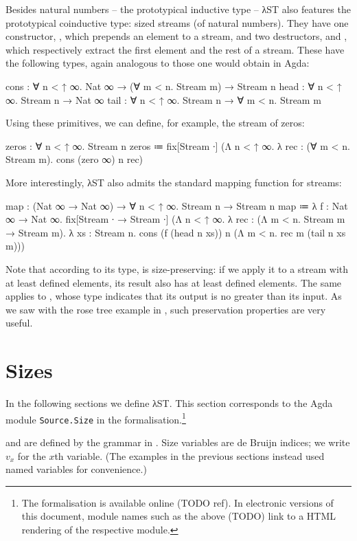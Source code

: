Besides natural numbers -- the prototypical inductive type -- λST also features
the prototypical coinductive type: sized streams (of natural numbers). They have
one constructor, , which prepends an element to a stream, and two
destructors,  and , which respectively extract the first
element and the rest of a stream. These have the following types, again
analogous to those one would obtain in Agda:
\begin{code}
  cons : ∀ n < ↑ ∞. Nat ∞ → (∀ m < n. Stream m) → Stream n
  head : ∀ n < ↑ ∞. Stream n → Nat ∞
  tail : ∀ n < ↑ ∞. Stream n → ∀ m < n. Stream m
\end{code}
Using these primitives, we can define, for example, the stream of zeros:
\begin{code}
  zeros : ∀ n < ↑ ∞. Stream n
  zeros ≔ fix[Stream ∙]
            (Λ n < ↑ ∞. λ rec : (∀ m < n. Stream m).
              cons (zero ∞) n rec)
\end{code}
More interestingly, λST also admits the standard mapping function for streams:
\begin{code}
  map : (Nat ∞ → Nat ∞) → ∀ n < ↑ ∞. Stream n → Stream n
  map ≔ λ f : Nat ∞ → Nat ∞. fix[Stream ∙ → Stream ∙]
          (Λ n < ↑ ∞. λ rec : (Λ m < n. Stream m → Stream m). λ xs : Stream n.
            cons (f (head n xs)) n (Λ m < n. rec m (tail n xs m)))
\end{code}
Note that according to its type,  is size-preserving: if we apply it
to a stream with at least  defined elements, its result also has at
least  defined elements. The same applies to , whose type
indicates that its output is no greater than its input. As we saw with the rose
tree example in , such preservation properties are very
useful.


\section{Sizes}
\label{sec:source:sizes}

In the following sections we define λST. This section corresponds to the Agda
module \texttt{Source.\allowbreak Size} in the formalisation.\footnote{The
  formalisation is available online (TODO ref). In electronic versions of this
  document, module names such as the above (TODO) link to a HTML rendering of
  the respective module.}

 and  are defined by the grammar in
. Size variables are de Bruijn indices; we write $v_x$ for
the $x$th variable. (The examples in the previous sections instead used named
variables for convenience.)

